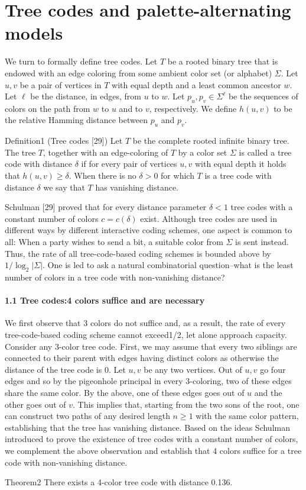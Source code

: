 \section*{Tree codes and palette-alternating models}
We turn to formally define tree codes. Let $T$ be a rooted binary tree that is endowed with an edge coloring from some ambient color set (or alphabet) $\Sigma$. Let $u,v$ be a pair of vertices in $T$ with equal depth and a least common ancestor $w$. Let $\ell$ be the distance, in edges, from $u$ to $w$. Let $p_u,p_v\in\Sigma^\ell$ be the sequences of colors on the path from $w$ to $u$ and to $v$, respectively. We define $h(u,v)$ to be the relative Hamming distance between $p_u$ and $p_v$.
\begin{authorclaim}{Definition1 (Tree codes [29])}
Let $T$ be the complete rooted infinite binary tree. The tree $T$, together with an edge-coloring of $T$ by a color set $\Sigma$ is called a tree code with distance $\delta$ if for every pair of vertices $u,v$ with equal depth it holds that $h(u,v)\ge\delta$. When there is no $\delta>0$ for which $T$ is a tree code with distance $\delta$ we say that $T$ has vanishing distance.
\end{authorclaim}
Schulman [29] proved that for every distance parameter $\delta<1$ tree codes with a constant number of colors $c=c(\delta)$ exist. Although tree codes are used in different ways by different interactive coding schemes, one aspect is common to all: When a party wishes to send a bit, a suitable color from $\Sigma$ is sent instead. Thus, the rate of all tree-code-based coding schemes is bounded above by $1/\log_2|\Sigma|$. One is led to ask a natural combinatorial question--what is the least number of colors in a tree code with non-vanishing distance?
\paragraph{1.1 Tree codes:4 colors suffice and are necessary}
We first observe that 3 colors do not suffice and, as a result, the rate of every tree-code-based coding scheme cannot exceed1/2, let alone approach capacity. Consider any 3-color tree code. First, we may assume that every two siblings are connected to their parent with edges having distinct colors as otherwise the distance of the tree code is 0. Let $u,v$ be any two vertices. Out of $u,v$ go four edges and so by the pigeonhole principal in every 3-coloring, two of these edges share the same color. By the above, one of these edges goes out of $u$ and the other goes out of $v$. This implies that, starting from the two sons of the root, one can construct two paths of any desired length $n\ge1$ with the same color pattern, establishing that the tree has vanishing distance.
Based on the ideas Schulman introduced to prove the existence of tree codes with a constant number of colors, we complement the above observation and establish that 4 colors suffice for a tree code with non-vanishing distance.
\begin{authorclaim}{Theorem2}
There exists a 4-color tree code with distance 0.136.
\end{authorclaim}
